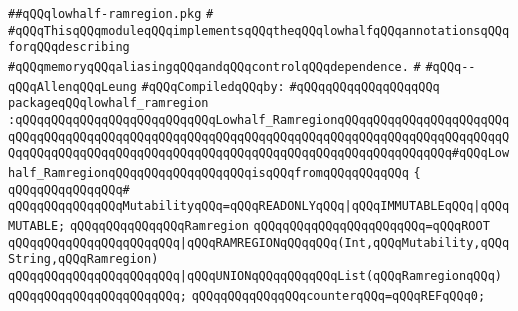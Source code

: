 \label{src/lib/compiler/back/low/aliasing/lowhalf-ramregion.pkg}
\verb|##qQQqlowhalf-ramregion.pkg|\newline
\verb|#|\newline
\verb|#qQQqThisqQQqmoduleqQQqimplementsqQQqtheqQQqlowhalfqQQqannotationsqQQqforqQQqdescribing|\newline
\verb|#qQQqmemoryqQQqaliasingqQQqandqQQqcontrolqQQqdependence.|\newline
\verb|#|\newline
\verb|#qQQq--qQQqAllenqQQqLeung|\newline
\newline
\verb|#qQQqCompiledqQQqby:|\newline
\verb|#qQQqqQQqqQQqqQQqqQQq|\newline
\newline
\newline
\newline
\verb|packageqQQqlowhalf_ramregion|\newline
\verb|:qQQqqQQqqQQqqQQqqQQqqQQqqQQqLowhalf_RamregionqQQqqQQqqQQqqQQqqQQqqQQqqQQqqQQqqQQqqQQqqQQqqQQqqQQqqQQqqQQqqQQqqQQqqQQqqQQqqQQqqQQqqQQqqQQqqQQqqQQqqQQqqQQqqQQqqQQqqQQqqQQqqQQqqQQqqQQqqQQqqQQqqQQqqQQqqQQq#qQQqLowhalf_RamregionqQQqqQQqqQQqqQQqqQQqisqQQqfromqQQqqQQqqQQq|\newline
\verb|{|\newline
\verb|qQQqqQQqqQQqqQQq#|\newline
\verb|qQQqqQQqqQQqqQQqMutabilityqQQq=qQQqREADONLYqQQq|\verb#|qQQqIMMUTABLEqQQq|qQQqMUTABLE;#\newline
\newline
\verb|qQQqqQQqqQQqqQQqRamregion|\newline
\verb|qQQqqQQqqQQqqQQqqQQqqQQq=qQQqROOT|\newline
\verb|qQQqqQQqqQQqqQQqqQQqqQQq|\verb#|qQQqRAMREGIONqQQqqQQq(Int,qQQqMutability,qQQqString,qQQqRamregion)#\newline
\verb|qQQqqQQqqQQqqQQqqQQqqQQq|\verb#|qQQqUNIONqQQqqQQqqQQqList(qQQqRamregionqQQq)#\newline
\verb|qQQqqQQqqQQqqQQqqQQqqQQq;|\newline
\newline
\verb|qQQqqQQqqQQqqQQqcounterqQQq=qQQqREFqQQq0;|\newline
\newline
